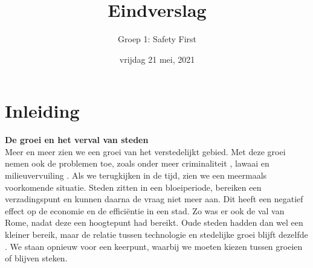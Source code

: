 \documentclass[a4paper,kulak]{kulakarticle}
\title{Eindverslag}
\author{Groep 1: Safety First}
\date{vrijdag 21 mei, 2021}
\begin{document}
\maketitle
\tableofcontents

\newpage

\section{Inleiding}

\textbf{\large De groei en het verval van steden} \\
Meer en meer zien we een groei van het verstedelijkt gebied. Met deze groei nemen ook de problemen toe, zoals onder meer criminaliteit \cite{crimi}, lawaai \cite{lawaai} en milieuvervuiling \cite{milieu}. Als we terugkijken in de tijd, zien we een meermaals voorkomende situatie. Steden zitten in een bloeiperiode, bereiken een verzadingspunt en kunnen daarna de vraag niet meer aan. Dit heeft een negatief effect op de economie en de efficiëntie in een stad. Zo was er ook de val van Rome, nadat deze een hoogtepunt had bereikt. Oude steden hadden dan wel een kleiner bereik, maar de relatie tussen technologie en stedelijke groei blijft dezelfde \cite{smartcities} . We staan opnieuw voor een keerpunt, waarbij we moeten kiezen tussen groeien of blijven steken.
\end{document}
